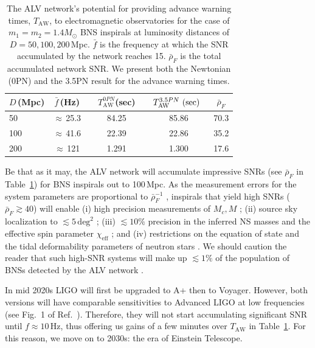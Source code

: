 \documentclass[prd,amsmath,amssymb,aps,floats,amsfonts,notitlepage,superscriptaddress,eqsecnum,nofootinbib,10pt]{revtex4-1}
\newcommand\T{\rule{0pt}{2.6ex}}       %
\newcommand\B{\rule[-1.2ex]{0pt}{0pt}} %
\begin{document}
\begin{table}[h]
\centering
\begin{tabular}{lcccccc}
\hline\hline
$D\,$(Mpc) & $\bar{f}\,$(Hz) &{}& $T^{0PN}_\text{AW}$(sec) &\hspace{1mm} & $T^{3.5PN}_\text{AW}\text{ (sec)}\hspace{2mm}$& $\bar{\rho}_F$\T\B\\
\hline
50 & $\approx\,$25.3 & & 84.25 & & 85.86 & 70.3 \T\\
100 & $\approx\,$41.6 & & 22.39 & & 22.86 & 35.2 \\
200 & $\approx\,$121 & & 1.291 &\quad & 1.300 & 17.6 \\
\hline\hline
\end{tabular}
\caption{The ALV network's potential for providing advance warning times, $T_\text{AW}$, 
to electromagnetic observatories for the case of $m_1=m_2=1.4 M_\odot$ BNS inspirals at luminosity distances of $D=50,100,200\,$Mpc. 
$\bar{f}$ is the frequency at which the  %
SNR accumulated by the network reaches 15. 
$\bar{\rho}_F$ is the total accumulated network SNR. %
We present both the Newtonian (0PN) 
and the 3.5PN result for the advance warning times.}\label{table:LIGO2020}
\end{table}
%
%
Be that as it may,
the ALV network will accumulate impressive SNRs 
(see $\bar{\rho}_F$ in Table~\ref{table:LIGO2020}) for BNS inspirals out to 100\,Mpc.
As the measurement errors for the system parameters are proportional to $\bar\rho^{-1}_F$ \cite{Cutler:1994ys},
inspirals that yield high SNRs ($\bar\rho_F\gtrsim 40$) will enable (i) high precision measurements of 
$M_c, M$ \cite{Farr:2015lna}; (ii) source sky localization to $\lesssim 5\,\text{deg}^2$ \cite{Rodriguez:2013oaa};
(iii) $ \lesssim 10\%$ precision in the inferred NS masses \cite{Rodriguez:2013oaa} and the effective spin parameter $\chi_\text{eff}$ \cite{Zhu:2017znf}; and
(iv) restrictions on the equation of state and the tidal deformability
parameters of neutron stars \cite{Read:2009yp, Andersson:2009yt, PhysRevD.89.103012, PhysRevD.91.043002}.
We should caution the reader that such high-SNR systems will make up $\lesssim 1\%$ of the population of BNSs detected by 
the ALV network \cite{Sathyaprakash:2012jk}.

In mid 2020s LIGO will first be upgraded to A+ then to Voyager. 
However, both versions will have comparable sensitivities to Advanced LIGO
at low frequencies (see Fig.~1 of Ref.~\cite{Mills:2017urp}).
Therefore, they will not start accumulating significant SNR until $f\approx 10\,$Hz, thus offering us gains of a few minutes over $T_\text{AW}$ in Table~\ref{table:LIGO2020}. For this reason, we move on to 2030s: the 
era of Einstein Telescope.
\end{document}
